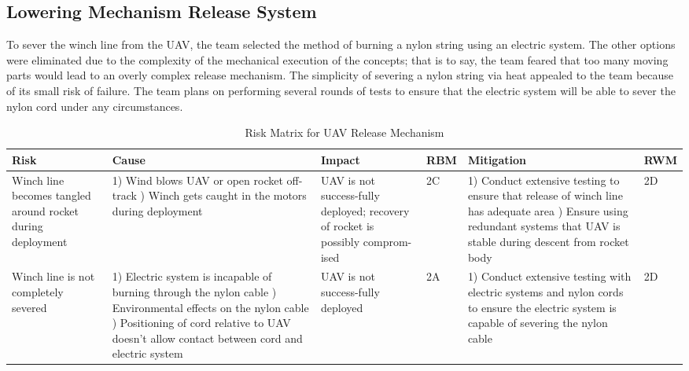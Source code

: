 			\subsection{Lowering Mechanism Release System}
				To sever the winch line from the UAV, the team selected the method of burning a nylon string using an electric system. The other options were eliminated due to the complexity of the mechanical execution of the concepts; that is to say, the team feared that too many moving parts would lead to an overly complex release mechanism. The simplicity of severing a nylon string via heat appealed to the team because of its small risk of failure. The team plans on performing several rounds of tests to ensure that the electric system will be able to sever the nylon cord under any circumstances. 
				\begin{table}[H]
					\label{UAV Release Mechanism}
					{\footnotesize
					\caption{Risk Matrix for UAV Release Mechanism}
					\centering
					\begin{tabularx}{\linewidth}{XXXlXl}
					\toprule
					\textbf{Risk}                                            & \textbf{Cause}                                                                                                                 & \textbf{Impact}                                                                                                                           & \textbf{RBM}  & \textbf{Mitigation}                                                                                                                                                                                     & \textbf{RWM} \\
					\midrule
					Winch line becomes tangled around rocket during deployment & 1) Wind blows UAV or open rocket off-track \newline 2) Winch gets caught in the motors during deployment & UAV is not success-fully deployed; recovery of rocket is possibly comprom-ised & \cellcolor{orange!25} 2C & 1) Conduct extensive testing to ensure that release of winch line has adequate area \newline 2) Ensure using redundant systems that UAV is stable during descent from rocket body & \cellcolor{orange!25} 2D \\
					Winch line is not completely severed & 1) Electric system is incapable of burning through the nylon cable \newline 2) Environmental effects on the nylon cable \newline 3) Positioning of cord relative to UAV doesn’t allow contact between cord and electric system & UAV is not success-fully deployed & \cellcolor{red!25} 2A & 1) Conduct extensive testing with electric systems and nylon cords to ensure the electric system is capable of severing the nylon cable & \cellcolor{orange!25} 2D \\

\end{tabularx}}
\end{table}

